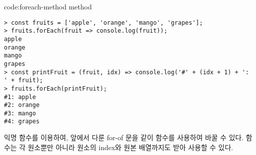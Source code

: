\begin{codeenv}{code:foreach-method}{ method}\begin{verbatim}
> const fruits = ['apple', 'orange', 'mango', 'grapes'];
> fruits.forEach(fruit => console.log(fruit));
apple
orange
mango
grapes
> const printFruit = (fruit, idx) => console.log('#' + (idx + 1) + ': ' + fruit);
> fruits.forEach(printFruit);
#1: apple
#2: orange
#3: mango
#4: grapes
\end{verbatim}
\end{codeenv}

익명 함수를 이용하여, 앞에서 다룬 for-of 문을 \와 같이  함수를 사용하여 바꿀 수 있다.  함수는 각 원소뿐만 아니라 원소의 index와 원본 배열까지도 받아 사용할 수 있다.
